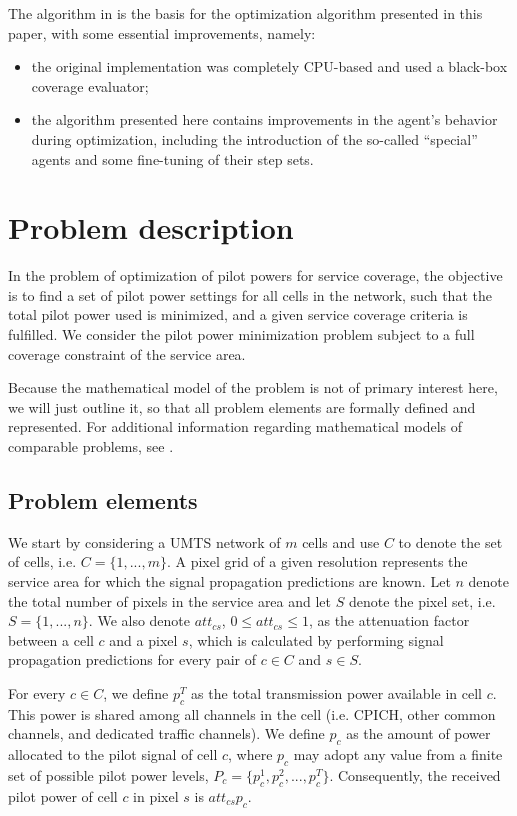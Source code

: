 The algorithm in \cite{Benedicic_Pilot.power.optimization:2010} is
the basis for the optimization algorithm presented in this paper,
with some essential improvements, namely:
\begin{itemize}
\item the original implementation was completely CPU-based and used a black-box
coverage evaluator;
\item the algorithm presented here contains improvements in the agent's
behavior during optimization, including the introduction of the so-called
``special'' agents and some fine-tuning of their step sets.
\end{itemize}

\section{Problem description}

In the problem of optimization of pilot powers for service coverage,
the objective is to find a set of pilot power settings for all cells
in the network, such that the total pilot power used is minimized,
and a given service coverage criteria is fulfilled. We consider the
pilot power minimization problem subject to a full coverage constraint
of the service area.

Because the mathematical model of the problem is not of primary interest
here, we will just outline it, so that all problem elements are formally
defined and represented. For additional information regarding mathematical
models of comparable problems, see \cite{Nawrocki_Understanding:2006}.


\subsection{Problem elements}

We start by considering a UMTS network of $m$ cells and use $C$
to denote the set of cells, i.e. $C=\{1,...,m\}$. A pixel grid of
a given resolution represents the service area for which the signal
propagation predictions are known. Let $n$ denote the total number
of pixels in the service area and let $S$ denote the pixel set, i.e.
$S=\{1,...,n\}$. We also denote $att_{cs}$, $0\le att_{cs}\le1$,
as the attenuation factor between a cell $c$ and a pixel $s$, which
is calculated by performing signal propagation predictions for every
pair of $c\in C$ and $s\in S$.

For every $c\in C$, we define $p_{c}^{T}$ as the total transmission
power available in cell $c$. This power is shared among all channels
in the cell (i.e. CPICH, other common channels, and dedicated traffic
channels). We define $p_{c}$ as the amount of power allocated to
the pilot signal of cell $c$, where $p_{c}$ may adopt any value
from a finite set of possible pilot power levels, $P_{c}=\{p_{c}^{1},p_{c}^{2},...,p_{c}^{T}\}$.
Consequently, the received pilot power of cell $c$ in pixel $s$
is $att_{cs}p_{c}$.

